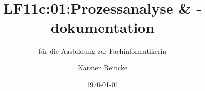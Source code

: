 \documentclass[]{beamer}
\title{LF11c:01:Prozessanalyse \& -dokumentation}
\subtitle{für die Ausbildung zur Fachinformatikerin}
\institute{GS-LDK}
\author{Karsten Reincke}
\date{\today}
\def\cfgGl{../../../cfg.gl/}
\begin{document}

\begin{frame}
  \titlepage
\end{frame}






\logo{}
\newpage



%
\end{document}
